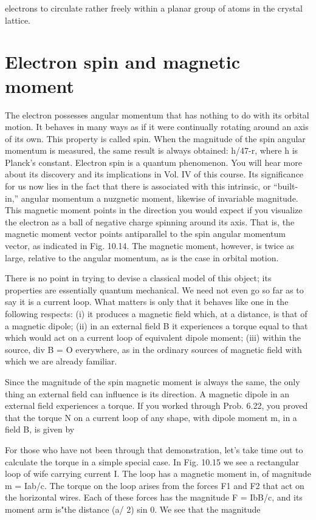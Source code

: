 electrons to circulate rather freely within a planar group of atoms
in the crystal lattice.

\section{Electron spin and magnetic moment}

The electron possesses angular momentum that has nothing to
do with its orbital motion. It behaves in many ways as if it were
continually rotating around an axis of its own. This property is
called spin. When the magnitude of the spin angular momentum
is measured, the same result is always obtained: h/47-r, where h is
Planck's constant. Electron spin is a quantum phenomenon. You
will hear more about its discovery and its implications in Vol. IV of
this course. Its significance for us now lies in the fact that there is
associated with this intrinsic, or ``built-in,'' angular momentum a
nuzgnetic moment, likewise of invariable magnitude. This magnetic
moment points in the direction you would expect if you visualize
the electron as a ball of negative charge spinning around its axis.
That is, the magnetic moment vector points antiparallel to the spin
angular momentum vector, as indicated in Fig. 10.14. The magnetic
moment, however, is twice as large, relative to the angular 
momentum, as is the case in orbital motion.

There is no point in trying to devise a classical model of this object;
its properties are essentially quantum mechanical. We need not
even go so far as to say it is a current loop. What matters is only that
it behaves like one in the following respects: (i) it produces a magnetic
field which, at a distance, is that of a magnetic dipole; (ii) in an
external field B it experiences a torque equal to that which would
act on a current loop of equivalent dipole moment; (iii) within the
source, div B = O everywhere, as in the ordinary sources of magnetic
field with which we are already familiar.

Since the magnitude of the spin magnetic moment is always the
same, the only thing an external field can influence is its direction.
A magnetic dipole in an external field experiences a torque. If you
worked through Prob. 6.22, you proved that the torque N on a current
loop of any shape, with dipole moment m, in a field B, is given by

For those who have not been through that demonstration, let's take
time out to calculate the torque in a simple special case. In Fig. 10.15
we see a rectangular loop of wife carrying current I. The loop has
a magnetic moment in, of magnitude m = Iab/c. The torque on
the loop arises from the forces F1 and F2 that act on the horizontal
wires. Each of these forces has the magnitude F = IbB/c, and its
moment arm is"the distance (a/ 2) sin 0. We see that the magnitude

